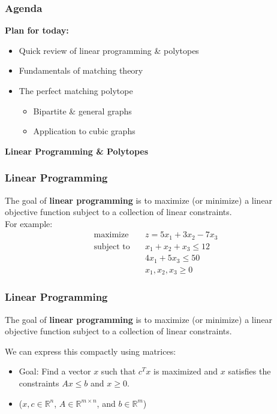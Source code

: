 
\begin{frame}
\frametitle{Agenda} \textbf{Plan for today:} 
\begin{itemize}
	\item Quick review of linear programming \& polytopes
	\item Fundamentals of matching theory
	\item The perfect matching polytope
		\begin{itemize}
			\item Bipartite \& general graphs
			\item Application to cubic graphs
		\end{itemize}
\end{itemize}
\end{frame}

\begin{frame}
\begin{center}
	\Large \textbf{Linear Programming \& Polytopes}
\end{center}
\end{frame}

\begin{frame}
\frametitle{Linear Programming}
The goal of \textbf{linear programming} is to maximize (or minimize) a linear objective function subject to a collection of linear constraints. \\
\vspace{0.3cm}
For example:
\begin{align*}
\text{maximize} \quad &z = 5x_1 + 3x_2 - 7x_3 \\
\text{subject to} \quad & x_1 + x_2 + x_3 \leq 12 \\
& 4x_1 + 5x_3 \leq 50 \\
& x_1, x_2, x_3 \geq 0
\end{align*}
\end{frame}

\begin{frame}
\frametitle{Linear Programming}
The goal of \textbf{linear programming} is to maximize (or minimize) a linear objective function subject to a collection of linear constraints. \\
\vspace{0.3cm}

We can express this compactly using matrices:
\begin{itemize}
	\item Goal: Find a vector \( x \) such that \( c^{T} x \) is maximized and \( x \) satisfies the constraints \( A x \leq b \) and \( x \geq 0 \).
	\item (\( x, c \in \mathbb{R}^{n}  \), \( A \in \mathbb{R}^{m \times n} \), and \( b \in \mathbb{R}^{m}  \))
\end{itemize}
\end{frame}

